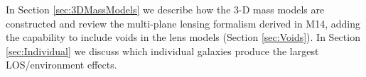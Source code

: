 In Section \ref{sec:3DMassModels} we describe how the 3-D mass models are constructed and review the multi-plane lensing formalism derived in M14, adding the capability to include voids in the lens models (Section \ref{sec:Voids}). In Section \ref{sec:Individual} we discuss which individual galaxies produce the largest LOS/environment effects.